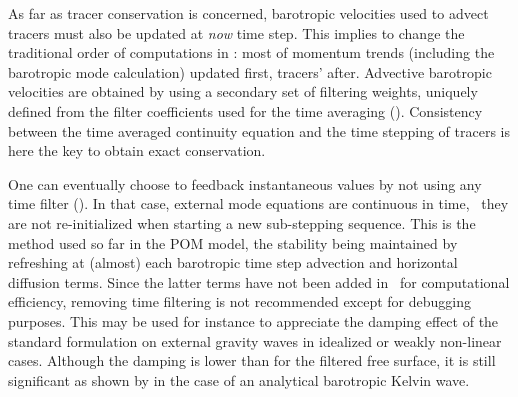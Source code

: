\documentclass[../main/NEMO_manual]{subfiles}
\begin{document}
As far as tracer conservation is concerned,
barotropic velocities used to advect tracers must also be updated at \textit{now} time step.
This implies to change the traditional order of computations in \NEMO:
most of momentum trends (including the barotropic mode calculation) updated first, tracers' after.
Advective barotropic velocities are obtained by using a secondary set of filtering weights,
uniquely defined from the filter coefficients used for the time averaging (\citet{shchepetkin.mcwilliams_OM05}).
Consistency between the time averaged continuity equation and the time stepping of tracers is here the key to
obtain exact conservation.


One can eventually choose to feedback instantaneous values by not using any time filter
().
In that case, external mode equations are continuous in time,
\ie\ they are not re-initialized when starting a new sub-stepping sequence.
This is the method used so far in the POM model, the stability being maintained by
refreshing at (almost) each barotropic time step advection and horizontal diffusion terms.
Since the latter terms have not been added in \NEMO\ for computational efficiency,
removing time filtering is not recommended except for debugging purposes.
This may be used for instance to appreciate the damping effect of the standard formulation on
external gravity waves in idealized or weakly non-linear cases.
Although the damping is lower than for the filtered free surface,
it is still significant as shown by \citet{levier.treguier.ea_trpt07} in the case of an analytical barotropic Kelvin wave.
\end{document}
